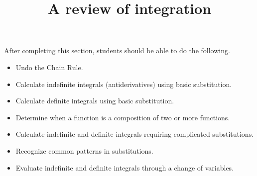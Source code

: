 \documentclass{ximera}
\title{A review of integration}
\begin{document}
\begin{abstract}
\end{abstract}

\maketitle

\begin{sectionOutcomes}

After completing this section, students should be able to do the following.

\begin{itemize}
	\item Undo the Chain Rule.
	\item Calculate indefinite integrals (antiderivatives) using basic substitution.
	\item Calculate definite integrals using basic substitution.
        \item Determine when a function is a composition of two or more functions.
	\item Calculate indefinite and definite integrals requiring complicated substitutions.
	\item Recognize common patterns in substitutions.
	\item Evaluate indefinite and definite integrals through a change of variables.
\end{itemize}

\end{sectionOutcomes}
\end{document}
